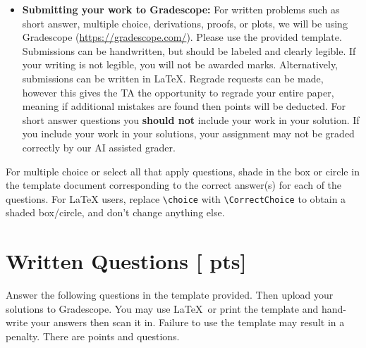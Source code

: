 \documentclass[11pt,addpoints,answers]{exam}
\numberwithin{equation}{section} %
\numberwithin{figure}{section} %
\numberwithin{table}{section} %
\newcommand{\pts}[1]{\textbf{[#1 pts]}}
\begin{document}
\begin{itemize}
\item \textbf{Submitting your work to Gradescope:} For written problems such as short answer, multiple choice, derivations, proofs, or plots, we will be using Gradescope (\url{https://gradescope.com/}). Please use the provided template. Submissions can be handwritten, but should be labeled and clearly legible. If your writing is not legible, you will not be awarded marks. Alternatively, submissions can be written in LaTeX. Regrade requests can be made, however this gives the TA the opportunity to regrade your entire paper, meaning if additional mistakes are found then points will be deducted. For short answer questions you \textbf{should not} include your work in your solution.  If you include your work in your solutions, your assignment may not be graded correctly by our AI assisted grader. 



\end{itemize}


For multiple choice or select all that apply questions, shade in the box or circle in the template document corresponding to the correct answer(s) for each of the questions. For \LaTeX{} users, replace \lstinline{\choice} with \lstinline{\CorrectChoice} to obtain a shaded box/circle, and don't change anything else.


\clearpage

%
%
\section{Written Questions \pts{\numpoints{}}}
\label{sec:warmup}
Answer the following questions in the template provided.  Then upload your solutions to Gradescope. You may use \LaTeX\ or print the template and hand-write your answers then scan it in. Failure to use the template may result in a penalty. There are \numpoints{} points and \numquestions{} questions.
\end{document}
